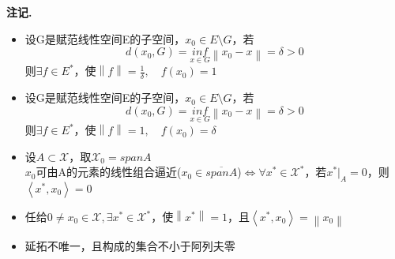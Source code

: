 \documentclass[12pt, a4paper, oneside]{ctexbook}
\newenvironment{note}{\par\noindent\textbf{注记. }}{\par}
\begin{document}
\begin{note}
\begin{itemize}
	\item 设G是赋范线性空间E的子空间，$x_0\in E\setminus G$，若\begin{equation*}
		d(x_0,G)=\underset{x\in G}{inf}\left \| x_0-x\right \|=\delta >0
	\end{equation*}
则$\exists f \in E^*$，使$\left \| f\right \|=\frac{1}{\delta},\quad f(x_0)=1$
\item  设G是赋范线性空间E的子空间，$x_0\in E\setminus G$，若\begin{equation*}
	d(x_0,G)=\underset{x\in G}{inf}\left \| x_0-x\right \|=\delta >0
\end{equation*}
则$\exists f \in E^*$，使$\left \| f\right \|=1,\quad f(x_0)=\delta$
\item 设$A\subset \mathscr{X}$，取$\mathscr{X}_0=span A$\\
$x_0$可由A的元素的线性组合逼近($x_0\in \overline{span A}$)$\Leftrightarrow \forall x^*\in \mathscr{X}^*$，若$x^*|_A=0$，则$\left \langle x^*,x_0\right \rangle=0$
\item 任给$0\neq x_0\in \mathscr{X},\exists x^*\in \mathscr{X}^*$，使$\left \| x^*\right \|=1$，且$\left \langle x^*,x_0\right \rangle=\left \| x_0\right \|$
\item 延拓不唯一，且构成的集合不小于阿列夫零
\end{itemize}
\end{note}
\end{document}
